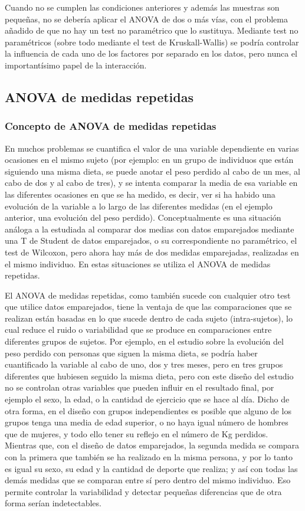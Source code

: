 Cuando no se cumplen las condiciones anteriores y además las muestras son pequeñas, no se debería aplicar el ANOVA de
dos o más vías, con el problema añadido de que no hay un test no paramétrico que lo sustituya. Mediante test no
paramétricos (sobre todo mediante el test de Kruskall-Wallis) se podría controlar la influencia de cada uno de los
factores por separado en los datos, pero nunca el importantísimo papel de la interacción.


\subsection{ANOVA de medidas repetidas}

\subsubsection{Concepto de ANOVA de medidas repetidas}
En muchos problemas se cuantifica el valor de una variable dependiente en varias ocasiones en el mismo sujeto (por
ejemplo: en un grupo de individuos que están siguiendo una misma dieta, se puede anotar el peso perdido al cabo de un
mes, al cabo de dos y al cabo de tres), y se intenta comparar la media de esa variable en las diferentes ocasiones en
que se ha medido, es decir, ver si ha habido una evolución de la variable a lo largo de las diferentes medidas (en el
ejemplo anterior, una evolución del peso perdido). Conceptualmente es una situación análoga a la estudiada al comparar
dos medias con datos emparejados mediante una T de Student de datos emparejados, o su correspondiente no paramétrico, el
test de Wilcoxon, pero ahora hay más de dos medidas emparejadas, realizadas en el mismo individuo. En estas situaciones
se utiliza el ANOVA de medidas repetidas.

El ANOVA de medidas repetidas, como también sucede con cualquier otro test que utilice datos emparejados, tiene la
ventaja de que las comparaciones que se realizan están basadas en lo que sucede dentro de cada sujeto (intra-sujetos),
lo cual reduce el ruido o variabilidad que se produce en comparaciones entre diferentes grupos de sujetos. Por ejemplo,
en el estudio sobre la evolución del peso perdido con personas que siguen la misma dieta, se podría haber cuantificado
la variable al cabo de uno, dos y tres meses, pero en tres grupos diferentes que hubiesen seguido la misma dieta, pero
con este diseño del estudio no se controlan otras variables que pueden influir en el resultado final, por ejemplo el
sexo, la edad, o la cantidad de ejercicio que se hace al día. Dicho de otra forma, en el diseño con grupos
independientes es posible que alguno de los grupos tenga una media de edad superior, o no haya igual número de hombres
que de mujeres, y todo ello tener su reflejo en el número de Kg perdidos. Mientras que, con el diseño de datos
emparejados, la segunda medida se compara con la primera que también se ha realizado en la misma persona, y por lo tanto
es igual su sexo, su edad y la cantidad de deporte que realiza; y así con todas las demás medidas que se comparan entre
sí pero dentro del mismo individuo. Eso permite controlar la variabilidad y detectar pequeñas diferencias que de otra
forma serían indetectables.


